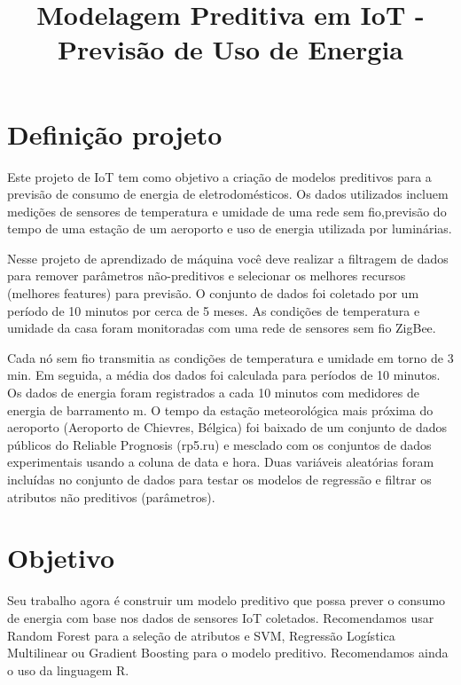 \documentclass[
]{article}
\title{Modelagem Preditiva em IoT - Previsão de Uso de Energia}
\author{}
\date{\vspace{-2.5em}}
\begin{document}
\maketitle

\hypertarget{definiuxe7uxe3o-projeto}{%
\section{Definição projeto}\label{definiuxe7uxe3o-projeto}}

Este projeto de IoT tem como objetivo a criação de modelos preditivos
para a previsão de consumo de energia de eletrodomésticos. Os dados
utilizados incluem medições de sensores de temperatura e umidade de uma
rede sem fio,previsão do tempo de uma estação de um aeroporto e uso de
energia utilizada por luminárias.

Nesse projeto de aprendizado de máquina você deve realizar a filtragem
de dados para remover parâmetros não-preditivos e selecionar os melhores
recursos (melhores features) para previsão. O conjunto de dados foi
coletado por um período de 10 minutos por cerca de 5 meses. As condições
de temperatura e umidade da casa foram monitoradas com uma rede de
sensores sem fio ZigBee.

Cada nó sem fio transmitia as condições de temperatura e umidade em
torno de 3 min. Em seguida, a média dos dados foi calculada para
períodos de 10 minutos. Os dados de energia foram registrados a cada 10
minutos com medidores de energia de barramento m. O tempo da estação
meteorológica mais próxima do aeroporto (Aeroporto de Chievres, Bélgica)
foi baixado de um conjunto de dados públicos do Reliable Prognosis
(rp5.ru) e mesclado com os conjuntos de dados experimentais usando a
coluna de data e hora. Duas variáveis aleatórias foram incluídas no
conjunto de dados para testar os modelos de regressão e filtrar os
atributos não preditivos (parâmetros).

\hypertarget{objetivo}{%
\section{Objetivo}\label{objetivo}}

Seu trabalho agora é construir um modelo preditivo que possa prever o
consumo de energia com base nos dados de sensores IoT coletados.
Recomendamos usar Random Forest para a seleção de atributos e SVM,
Regressão Logística Multilinear ou Gradient Boosting para o modelo
preditivo. Recomendamos ainda o uso da linguagem R.
\end{document}
